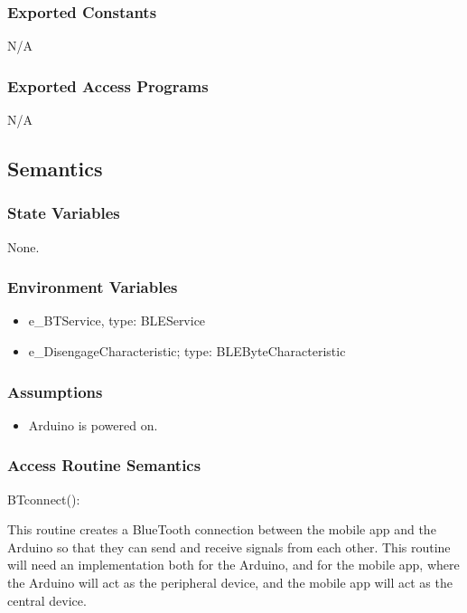 \documentclass[12pt, titlepage]{article}
\begin{document}
\subsubsection{Exported Constants}

N/A

\subsubsection{Exported Access Programs}

N/A

\subsection{Semantics}

\subsubsection{State Variables}

None.

\subsubsection{Environment Variables}

\begin{itemize}
\item e\_BTService, type: BLEService
\item e\_DisengageCharacteristic; type: BLEByteCharacteristic
\end{itemize}


\subsubsection{Assumptions}

\begin{itemize}
\item Arduino is powered on.
\end{itemize}

\subsubsection{Access Routine Semantics}

\noindent BTconnect():

This routine creates a BlueTooth connection between the mobile app and the Arduino so that they can send and receive signals from each other. This routine will need an implementation both for the Arduino, and for the mobile app, where the Arduino will act as the peripheral device, and the mobile app will act as the central device. 
\end{document}
